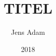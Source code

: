 \documentclass[
  BCOR=12mm,     %
  parskip=half,  %
  open=any,      %
  cleardoublepage=plain,  %
]{tudothesis}
\author{Jens Adam}
\title{TITEL}
\date{2018}
\begin{document}
\frontmatter
\maketitle

\makecorrectorpage

%
\tableofcontents

\mainmatter


% 




\printbibliography

\appendix
% 
% 
% 

\backmatter


\cleardoublepage

\end{document}
